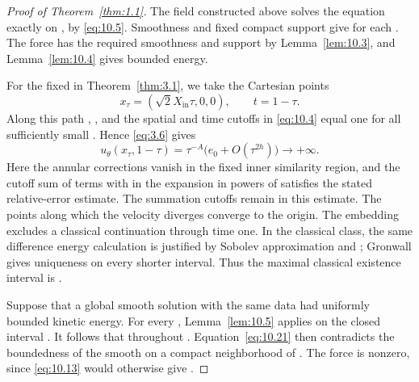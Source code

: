 %
\begin{proof}[Proof of Theorem~\ref{thm:1.1}]
The field constructed above solves the equation exactly on
\NSi{NS-F-P124-001}{[0,1)}, by \eqref{eq:10.5}. Smoothness and fixed compact support
give  for each
. The force has the required smoothness and support by
Lemma~\ref{lem:10.3}, and Lemma~\ref{lem:10.4} gives bounded energy.

For the fixed  in Theorem~\ref{thm:3.1}, we take
the Cartesian points
\begin{equation}
  x_\tau=(\sqrt2X_{\mathrm{in}}\tau,0,0),\qquad t=1-\tau.
\tag{10.20}\label{eq:10.20}
\end{equation}
Along this path , , and the
spatial and time cutoffs in \eqref{eq:10.4} equal one for all sufficiently small
. Hence \eqref{eq:3.6} gives
\begin{equation}
  u_\theta(x_\tau,1-\tau)
  =\tau^{-A}\bigl(e_0+O(\tau^{2h})\bigr)\longrightarrow+\infty.
\tag{10.21}\label{eq:10.21}
\end{equation}
Here the annular corrections vanish in the fixed inner similarity region, and the cutoff sum
of terms with  in the expansion in powers of
 satisfies the stated relative-error estimate. The summation
cutoffs remain in this estimate. The points  along which the
velocity diverges converge to the origin. The embedding
 excludes a classical
 continuation through time one. In the classical
 class, the same difference energy calculation is justified by
Sobolev approximation and ;
Gronwall gives uniqueness on every shorter interval. Thus the maximal classical existence
interval is \NSi{NS-F-P124-017}{[0,1)}.

Suppose that a global smooth solution  with the same data had
uniformly bounded kinetic energy. For every ,
Lemma~\ref{lem:10.5} applies on the closed interval . It
follows that  throughout \NSi{NS-F-P124-022}{[0,1)}.
Equation~\eqref{eq:10.21} then contradicts the boundedness of the smooth
 on a compact neighborhood of .
The force is nonzero, since \eqref{eq:10.13} would otherwise give
.


\end{proof}
